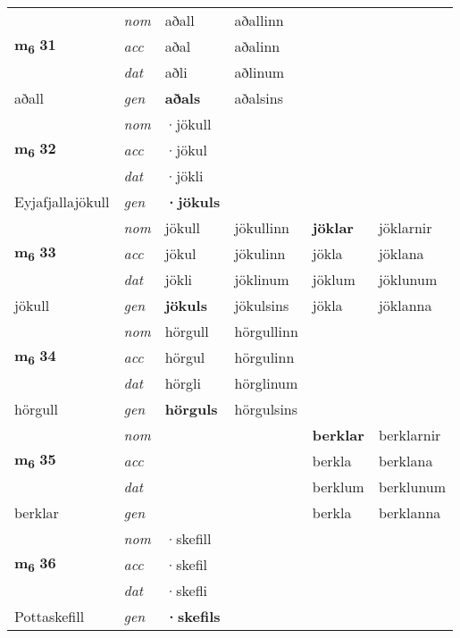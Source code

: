\begin{longtable}[l]{X>{\footnotesize\itshape}XXXXX}
\multirow{3}{*}{{{\textbf{m{\textsubscript{6}}} \Large{\textbf{31}}}}}  
 & nom & aðall & aðallinn    & \textbf{} &   \\*
 & acc & aðal  & aðalinn   &   &  \\*
 & dat & aðli & aðlinum   &  &  \\*
 {\footnotesize{aðall}} &  gen & \textbf{aðals}  & aðalsins  &  &  \\
\cmidrule{1-6}


\multirow{3}{*}{{{\textbf{m{\textsubscript{6}}} \Large{\textbf{32}}}}}  
 & nom & ·jökull &     & \textbf{} &   \\*
 & acc & ·jökul  &    &   &  \\*
 & dat & ·jökli &    &  &  \\*
 {\footnotesize{Eyjafjallajökull}} &  gen & \textbf{·jökuls}  &   &  &  \\
\cmidrule{1-6}


\multirow{3}{*}{{{\textbf{m{\textsubscript{6}}} \Large{\textbf{33}}}}}  
 & nom & jökull & jökullinn    & \textbf{jöklar} & jöklarnir  \\*
 & acc & jökul  & jökulinn   & jökla  & jöklana \\*
 & dat & jökli & jöklinum   & jöklum & jöklunum \\*
 {\footnotesize{jökull}} &  gen & \textbf{jökuls}  & jökulsins  & jökla & jöklanna \\
\cmidrule{1-6}


\multirow{3}{*}{{{\textbf{m{\textsubscript{6}}} \Large{\textbf{34}}}}}  
 & nom & hörgull & hörgullinn    & \textbf{} &   \\*
 & acc & hörgul  & hörgulinn   &   &  \\*
 & dat & hörgli & hörglinum   &  &  \\*
 {\footnotesize{hörgull}} &  gen & \textbf{hörguls}  & hörgulsins  &  &  \\
\cmidrule{1-6}


\multirow{3}{*}{{{\textbf{m{\textsubscript{6}}} \Large{\textbf{35}}}}}  
 & nom &  &     & \textbf{berklar} & berklarnir  \\*
 & acc &   &    & berkla  & berklana \\*
 & dat &  &    & berklum & berklunum \\*
 {\footnotesize{berklar}} &  gen & \textbf{}  &   & berkla & berklanna \\
\cmidrule{1-6}


\multirow{3}{*}{{{\textbf{m{\textsubscript{6}}} \Large{\textbf{36}}}}}  
 & nom & ·skefill &     & \textbf{} &   \\*
 & acc & ·skefil  &    &   &  \\*
 & dat & ·skefli &    &  &  \\*
 {\footnotesize{Pottaskefill}} &  gen & \textbf{·skefils}  &   &  &  \\
\cmidrule{1-6}



\end{longtable}
